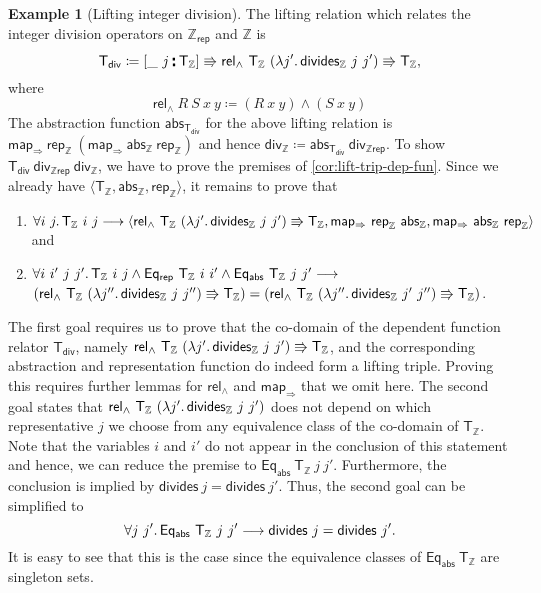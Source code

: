 \documentclass{article}
\theoremstyle{definition}
\newtheorem{example}[definition]{Example}
\newcommand{\eqrep}{\mathsf{Eq_{rep}}}
\newcommand{\eqabs}{\mathsf{Eq_{abs}}}
\newcommand{\mapfun}{\mathsf{map_\Rightarrow}}
\newcommand{\inte}{\mathbb{Z}}
\newcommand{\abs}{\mathsf{abs}}
\newcommand{\rep}{\mathsf{rep}}
\newcommand{\relint}{\mathsf{T_\inte}}
\newcommand{\reland}{\mathsf{rel_\land}}
\newcommand{\liftrel}{lifting relation\xspace}
\newcommand{\related}{\mathbin{\raisebox{-0.5pt}{$\centerdot$} \hspace{-2.9pt} \raisebox{3.5pt}{$\centerdot$}}}
\begin{document}
\begin{example}[Lifting integer division]
The \liftrel which relates the integer division operators on \(\inte_{\rep}\) and \(\inte\) is
\begin{equation*}
	\mathsf{T_{div}} \coloneqq [\_\ j \related \relint] \Rrightarrow \reland\ \relint\ (\lambda j'\ldotp \mathsf{divides_\inte}\ j\ j') \Rrightarrow \relint,
\end{equation*}
where
\begin{equation*}
	\reland\ R\ S\ x\ y \coloneqq (R\ x\ y) \land (S\ x\ y)
\end{equation*}
The abstraction function \(\abs_{\mathsf{T_{div}}}\) for the above lifting relation is \(\mapfun\ \rep_\inte\ (\mapfun\ \abs_\inte\ \rep_\inte)\) and hence \(\mathsf{div}_\inte \coloneqq \abs_{\mathsf{T_{div}}}\ \mathsf{div_{\inte rep}}\). To show \(\mathsf{T_{div}}\ \mathsf{div_{\inte rep}}\ \mathsf{div}_\inte\), we have to prove the premises of \cref{cor:lift-trip-dep-fun}. Since we already have \(\langle \relint, \abs_\inte, \rep_\inte \rangle\), it remains to prove that
\begin{enumerate}
	\item \(\forall i\ j\ldotp \relint\ i\ j \longrightarrow \langle \reland\ \relint\ (\lambda j'\ldotp \mathsf{divides_\inte}\ j\ j') \Rrightarrow \relint, \mapfun\ \rep_\inte\ \abs_\inte, \mapfun\ \abs_\inte\ \rep_\inte \rangle\) and
	\item \(\forall i\ i'\ j\ j'\ldotp \relint\ i\ j \land \eqrep\ \relint\ i\ i' \land \eqabs\ \relint\ j\ j' \longrightarrow\)\\
	\null\quad\( (\reland\ \relint\ (\lambda j''\ldotp \mathsf{divides_\inte}\ j\ j'') \Rrightarrow \relint) =(\reland\ \relint\ (\lambda j''\ldotp \mathsf{divides_\inte}\ j'\ j'') \Rrightarrow \relint)\).
\end{enumerate}
The first goal requires us to prove that the co-domain of the dependent function relator \(\mathsf{T_{div}}\),
namely \(\reland\ \relint\ (\lambda j'\ldotp \mathsf{divides_\inte}\ j\ j')\Rrightarrow \relint\),
and the corresponding abstraction and representation function do indeed form a lifting triple.
Proving this requires further lemmas for $\reland$ and $\mapfun$ that we omit here.
The second goal states that \(\reland\ \relint\ (\lambda j'\ldotp \mathsf{divides_\inte}\ j\ j')\) does not depend on which representative \(j\) we choose from any equivalence class of the co-domain of \(\mathsf{T_\inte}\). Note that the variables \(i\) and \(i'\) do not appear in the conclusion of this statement and hence, we can reduce the premise to \(\eqabs\ \mathsf{T}_\inte\ j\ j'\). Furthermore, the conclusion is implied by \(\mathsf{divides}\ j = \mathsf{divides}\ j'\). Thus, the second goal can be simplified to
\begin{equation*}
	\forall j\ j' \ldotp \eqabs\ \relint\ j\ j' \longrightarrow \mathsf{divides}\ j = \mathsf{divides}\ j'.
\end{equation*}
It is easy to see that this is the case since the equivalence classes of \(\eqabs\ \relint\) are singleton sets.
\end{example}
\end{document}
